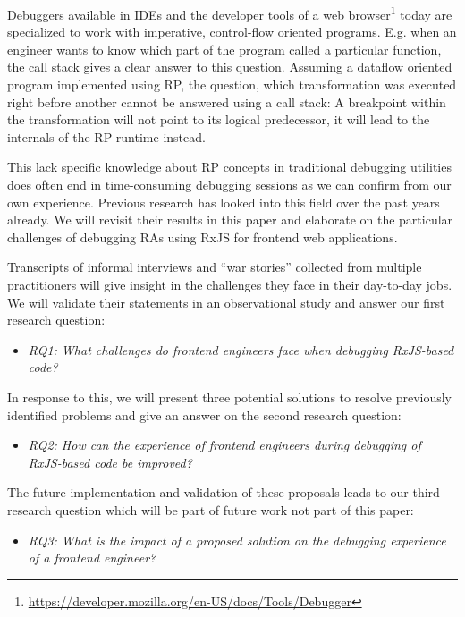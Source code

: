 \documentclass[12pt,a4paper]{article}
\begin{document}
Debuggers available in IDEs and the developer tools of a web browser\footnote{\url{https://developer.mozilla.org/en-US/docs/Tools/Debugger}} today are specialized to work with imperative, control-flow oriented programs. E.g. when an engineer wants to know which part of the program called a particular function, the call stack gives a clear answer to this question. Assuming a dataflow oriented program implemented using RP, the question, which transformation was executed right before another cannot be answered using a call stack: A breakpoint within the transformation will not point to its logical predecessor, it will lead to the internals of the RP runtime instead.

This lack specific knowledge about RP concepts in traditional debugging utilities does often end in time-consuming debugging sessions as we can confirm from our own experience. Previous research has looked into this field \cite{10.1145/2577080.2577083} \cite{10.1145/2884781.2884815} \cite{10.1145/3180155.3180156} over the past years already. We will revisit their results in this paper and elaborate on the particular challenges of debugging RAs using RxJS for frontend web applications.

Transcripts of informal interviews and ``war stories'' collected from multiple practitioners will give insight in the challenges they face in their day-to-day jobs. We will validate their statements in an observational study and answer our first research question:

\begin{itemize}
	\item \emph{RQ1: What challenges do frontend engineers face when debugging RxJS-based code?}
\end{itemize}

In response to this, we will present three potential solutions to resolve previously identified problems and give an answer on the second research question:

\begin{itemize}
	\item \emph{RQ2: How can the experience of frontend engineers during debugging of RxJS-based code be improved?}
\end{itemize}

The future implementation and validation of these proposals leads to our third research question which will be part of future work not part of this paper:

\begin{itemize}
	\item \emph{RQ3: What is the impact of a proposed solution on the debugging experience of a frontend engineer?}
\end{itemize}
\end{document}
